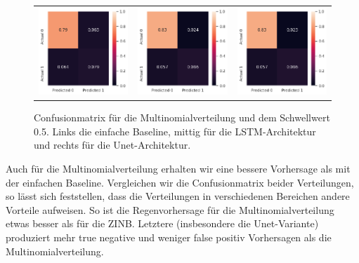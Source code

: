 \begin{figure}[h]
\begin{tabular}{ccc}
\includegraphics[width=45mm]{abb/simpleBaseLine.png}&
\includegraphics[width=45mm]{abb/categoricalConfusion_LSTM.png}&
\includegraphics[width=45mm]{abb/categoricalConfusion_UNET.png}
\end{tabular}
\caption{Confusionmatrix für die Multinomialverteilung und dem Schwellwert 0.5. Links die einfache Baseline, mittig für die LSTM-Architektur und rechts für die Unet-Architektur. \label{fig:confusionmatrix_cat}}
\end{figure}

\noindent Auch für die Multinomialverteilung erhalten wir eine bessere Vorhersage als mit der einfachen Baseline.
Vergleichen wir die Confusionmatrix beider Verteilungen, so lässt sich feststellen, dass die Verteilungen in verschiedenen Bereichen andere Vorteile aufweisen.
So ist die Regenvorhersage für die Multinomialverteilung etwas besser als für die ZINB. Letztere (insbesondere die Unet-Variante) produziert mehr true negative und weniger false positiv Vorhersagen als die Multinomialverteilung.\\

